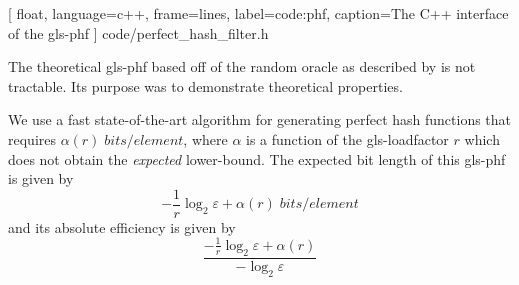 \documentclass[ ../main.tex]{subfiles}
\begin{document}

[
    float,
    language=c++,
    frame=lines,
    label={code:phf},
    caption={The C++ interface of the \gls{gls-phf}}
]
{code/perfect_hash_filter.h}


The theoretical \gls{gls-phf} based off of the random oracle as described by \cite{oph} is not tractable. Its purpose was to demonstrate theoretical properties.

We use a fast state-of-the-art algorithm \cite{chd} for generating perfect hash functions that requires $\alpha(r) \; \si{bits \per element}$, where $\alpha$ is a function of the \gls{gls-loadfactor} $r$ which does not obtain the \emph{expected} lower-bound. The expected bit length of this \gls{gls-phf} is given by
\begin{equation}
    -\frac{1}{r} \log_2 \varepsilon + \alpha(r) \; \si{bits \per element}
\end{equation}
and its absolute efficiency is given by
\begin{equation}
    \frac{-\frac{1}{r}\log_2 \varepsilon + \alpha(r)}{-\log_2 \varepsilon}
\end{equation}
\end{document}
